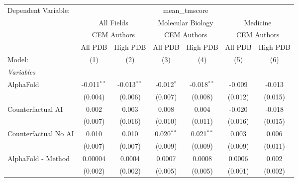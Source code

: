 \begingroup
\centering
\begin{tabular}{lcccccc}
   \tabularnewline \midrule \midrule
   Dependent Variable: & \multicolumn{6}{c}{mean\_tmscore}\\
 & \multicolumn{2}{c}{All Fields} & \multicolumn{2}{c}{Molecular Biology} & \multicolumn{2}{c}{Medicine} \\
\cmidrule(lr){2-3} \cmidrule(lr){4-5} \cmidrule(lr){6-7}
 & \multicolumn{2}{c}{CEM Authors} & \multicolumn{2}{c}{CEM Authors} & \multicolumn{2}{c}{CEM Authors} \\
\cmidrule(lr){2-3} \cmidrule(lr){4-5} \cmidrule(lr){6-7}
 & \multicolumn{1}{c}{All PDB} & \multicolumn{1}{c}{High PDB} & \multicolumn{1}{c}{All PDB} & \multicolumn{1}{c}{High PDB} & \multicolumn{1}{c}{All PDB} & \multicolumn{1}{c}{High PDB} \\
\cmidrule(lr){2-2} \cmidrule(lr){3-3} \cmidrule(lr){4-4} \cmidrule(lr){5-5} \cmidrule(lr){6-6} \cmidrule(lr){7-7}
   Model:                                                     & (1)           & (2)           & (3)          & (4)           & (5)      & (6)\\  
   \midrule
   \emph{Variables}\\
   AlphaFold                                                  & -0.011$^{**}$ & -0.013$^{**}$ & -0.012$^{*}$ & -0.018$^{**}$ & -0.009   & -0.013\\   
                                                              & (0.004)       & (0.006)       & (0.007)      & (0.008)       & (0.012)  & (0.015)\\   
   Counterfactual AI                                          & 0.002         & 0.003         & 0.008        & 0.004         & -0.020   & -0.018\\   
                                                              & (0.007)       & (0.016)       & (0.010)      & (0.011)       & (0.016)  & (0.015)\\   
   Counterfactual No AI                                       & 0.010         & 0.010         & 0.020$^{**}$ & 0.021$^{**}$  & 0.003    & 0.006\\   
                                                              & (0.007)       & (0.007)       & (0.009)      & (0.009)       & (0.009)  & (0.011)\\   
   AlphaFold - Method                                         & 0.00004       & 0.0004        & 0.0007       & 0.0008        & 0.0006   & 0.002\\   
                                                              & (0.002)       & (0.002)       & (0.005)      & (0.005)       & (0.001)  & (0.002)\\   

\end{tabular}

